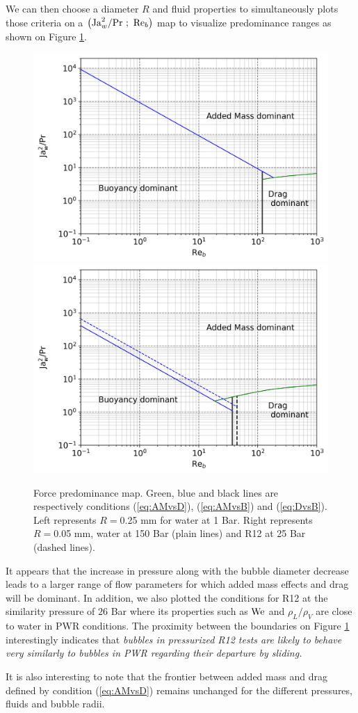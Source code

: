 We can then choose a diameter $R$ and fluid properties to simultaneously plots those criteria on a $\left( \mathrm{Ja}_{w}^{2}/\mathrm{Pr}\ ;\ \mathrm{Re}_{b} \right)$ map to visualize predominance ranges as shown on Figure \ref{fig:dom_slide}.
\begin{figure}[!htb]
\centering
\includegraphics[width=0.49\linewidth]{img/forces/map_1bar_bis.png}
\hfill
\includegraphics[width=0.49\linewidth]{img/forces/map_150bar_bis.png}
\caption{Force predominance map. Green, blue and black lines are respectively conditions (\ref{eq:AMvsD}),  (\ref{eq:AMvsB}) and (\ref{eq:DvsB}). Left represents $R=$0.25 mm for water at 1 Bar. Right represents $R=$0.05 mm, water at 150 Bar (plain lines) and R12 at 25 Bar (dashed lines).}
\label{fig:dom_slide}
\vspace{16pt}
\end{figure}

It appears that the increase in pressure along with the bubble diameter decrease leads to a larger range of flow parameters for which added mass effects and drag will be dominant. In addition, we also plotted the conditions for R12 at the similarity pressure of $26$ Bar where its properties such as $\mathrm{We}$ and $\rho_{L}/\rho_{V}$  are close to water in PWR conditions\cite{Garnier2001}. The proximity between the boundaries on Figure \ref{fig:dom_slide} interestingly indicates that \textit{bubbles in pressurized R12 tests are likely to behave very similarly to bubbles in PWR regarding their departure by sliding.}

It is also interesting to note that the frontier between added mass and drag defined by condition (\ref{eq:AMvsD}) remains unchanged for the different pressures, fluids and bubble radii.

